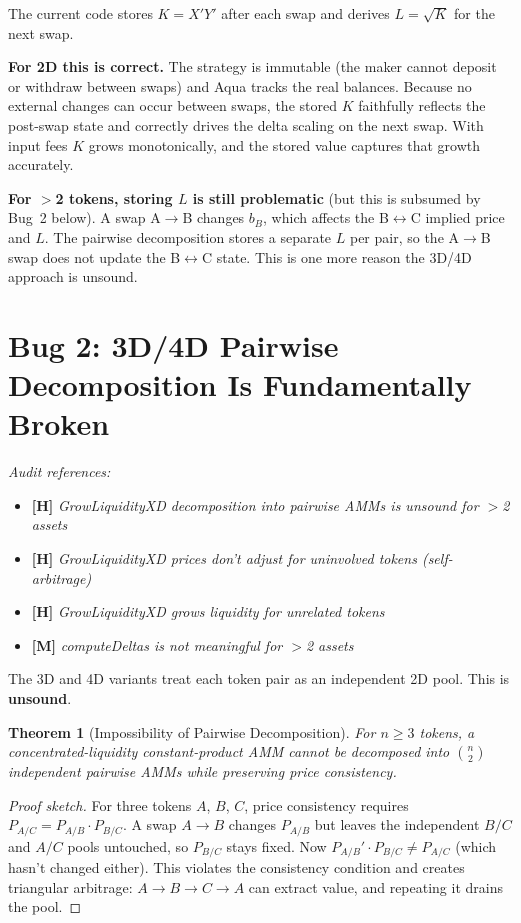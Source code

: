 \documentclass[11pt]{article}
\newtheorem{theorem}{Theorem}
\theoremstyle{definition}
\begin{document}
\medskip
The current code stores $K = X' Y'$ after each swap and derives $L = \sqrt{K}$
for the next swap.

\textbf{For 2D this is correct.}
The strategy is immutable (the maker cannot deposit or withdraw between swaps)
and Aqua tracks the real balances.  Because no external changes can occur
between swaps, the stored $K$ faithfully reflects the post-swap state and
correctly drives the delta scaling on the next swap.
With input fees $K$ grows monotonically, and the stored value captures
that growth accurately.

\textbf{For $>$2 tokens, storing $L$ is still problematic}
(but this is subsumed by Bug~2 below).
A swap A$\to$B changes $b_B$, which affects the B$\leftrightarrow$C implied
price and $L$.
The pairwise decomposition stores a separate $L$ per pair, so the A$\to$B
swap does not update the B$\leftrightarrow$C state.
This is one more reason the 3D/4D approach is unsound.


\section{Bug 2: 3D/4D Pairwise Decomposition Is Fundamentally Broken}
\label{sec:bug-3d}

\noindent\textit{Audit references:}
\begin{itemize}[nosep,leftmargin=2em]
\item \textbf{[H]} \textit{GrowLiquidityXD decomposition into pairwise AMMs is unsound for $>$2 assets}
\item \textbf{[H]} \textit{GrowLiquidityXD prices don't adjust for uninvolved tokens (self-arbitrage)}
\item \textbf{[H]} \textit{GrowLiquidityXD grows liquidity for unrelated tokens}
\item \textbf{[M]} \textit{computeDeltas is not meaningful for $>$2 assets}
\end{itemize}

\medskip
The 3D and 4D variants treat each token pair as an independent 2D pool.
This is \textbf{unsound}.

\begin{theorem}[Impossibility of Pairwise Decomposition]\label{thm:no-pairwise}
For $n \ge 3$ tokens, a concentrated-liquidity constant-product AMM cannot be
decomposed into $\binom{n}{2}$ independent pairwise AMMs while preserving
price consistency.
\end{theorem}

\begin{proof}[Proof sketch]
For three tokens $A$, $B$, $C$, price consistency requires
$P_{A/C} = P_{A/B} \cdot P_{B/C}$.
A swap $A \to B$ changes $P_{A/B}$ but leaves the independent $B/C$ and $A/C$
pools untouched, so $P_{B/C}$ stays fixed.  Now
$P_{A/B}' \cdot P_{B/C} \ne P_{A/C}$ (which hasn't changed either).
This violates the consistency condition and creates triangular arbitrage:
$A \to B \to C \to A$ can extract value, and repeating it drains the pool.
\end{proof}
\end{document}
